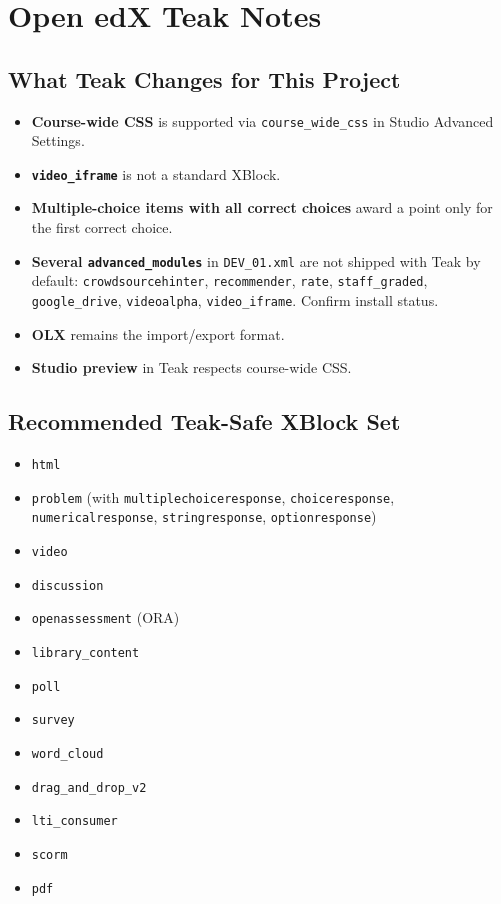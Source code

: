 \chapter{Open edX Teak Notes}
\label{app:teak}

\section{What Teak Changes for This Project}

\begin{itemize}
  \item \textbf{Course-wide CSS} is supported via
        \texttt{course\_wide\_css} in Studio Advanced Settings.
  \item \textbf{\texttt{video\_iframe}} is not a standard XBlock.
  \item \textbf{Multiple-choice items with all correct choices}
        award a point only for the first correct choice.
  \item \textbf{Several \texttt{advanced\_modules}} in
        \texttt{DEV\_01.xml} are not shipped with Teak by default:
        \texttt{crowdsourcehinter}, \texttt{recommender}, \texttt{rate},
        \texttt{staff\_graded}, \texttt{google\_drive}, \texttt{videoalpha},
        \texttt{video\_iframe}. Confirm install status.
  \item \textbf{OLX} remains the import/export format.
  \item \textbf{Studio preview} in Teak respects course-wide CSS.
\end{itemize}

\section{Recommended Teak-Safe XBlock Set}

\begin{itemize}
  \item \texttt{html}
  \item \texttt{problem} (with \texttt{multiplechoiceresponse},
        \texttt{choiceresponse}, \texttt{numericalresponse},
        \texttt{stringresponse}, \texttt{optionresponse})
  \item \texttt{video}
  \item \texttt{discussion}
  \item \texttt{openassessment} (ORA)
  \item \texttt{library\_content}
  \item \texttt{poll}
  \item \texttt{survey}
  \item \texttt{word\_cloud}
  \item \texttt{drag\_and\_drop\_v2}
  \item \texttt{lti\_consumer}
  \item \texttt{scorm}
  \item \texttt{pdf}
\end{itemize}